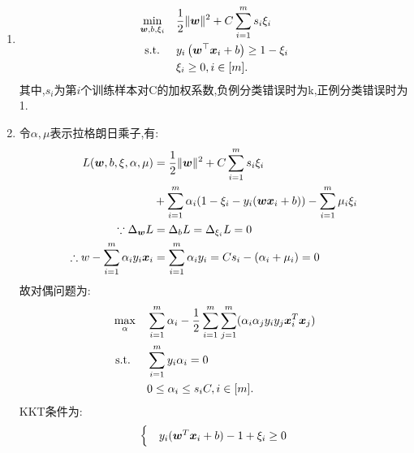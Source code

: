 \documentclass[answers]{exam}  %
\begin{document}
\begin{questions}
    \begin{solution}
        \begin{enumerate}
            \item
                  \begin{align*}
                      \min _{\boldsymbol{w}, b, \xi_{i}} \quad & \frac{1}{2}\|\boldsymbol{w}\|^{2}+C \sum_{i=1}^{m} s_i\xi_{i}  \\
                      \text { s.t. } \quad          & y_{i}\left(\boldsymbol{w}^\top {\boldsymbol{x}}_{i}+b\right) \geq 1-\xi_{i} \\
                                                    & \xi_{i} \geq 0, i\in [m] .
                  \end{align*}
                  其中,$s_i$为第$i$个训练样本对C的加权系数,负例分类错误时为k,正例分类错误时为1.
            \item 令$\alpha,\mu$表示拉格朗日乘子,有:
                  \begin{align*}
                      L(\boldsymbol{w},b,\xi,\alpha,\mu)                     & =\frac{1}{2} \|\boldsymbol{w}\|^{2}+C\sum_{i=1}^{m}s_i\xi_i                           \\
                                                                  & +\sum_{i=1}^{m}\alpha_i(1-\xi_i-y_i(\boldsymbol{w} {\boldsymbol{x}}_i+b))-\sum_{i=1}^{m}\mu_i\xi_i \\
                      \because \Delta_{\boldsymbol{w}}L                      & =\Delta_{b}L=\Delta_{\xi_i}L=0                                             \\
                      \therefore w-\sum_{i=1}^{m}\alpha_iy_i{\boldsymbol{x}}_i & =\sum_{i=1}^{m}\alpha_iy_i=Cs_i-(\alpha_i+\mu_i)=0
                  \end{align*}
                  故对偶问题为:
                  \begin{align*}
                      \max _{\alpha} \quad & \sum_{i=1}^{m}\alpha_i-\frac{1}{2} \sum_{i=1}^{m}\sum_{j=1}^{m}(\alpha_i\alpha_jy_iy_j{\boldsymbol{x}}_i^T{\boldsymbol{x}}_j) \\
                      \text { s.t. } \quad & \sum_{i=1}^{m}y_i\alpha_i=0                                                                         \\
                                           & 0\leq \alpha_i\leq s_iC ,i\in [m].
                  \end{align*}
                  KKT条件为:
                  $$
                      \begin{cases}
                           & y_i(\vw^T\vx_i+b)-1+\xi_i\geq 0                                 \\

\end{cases}$$
\end{enumerate}
\end{solution}
\end{questions}
\end{document}
